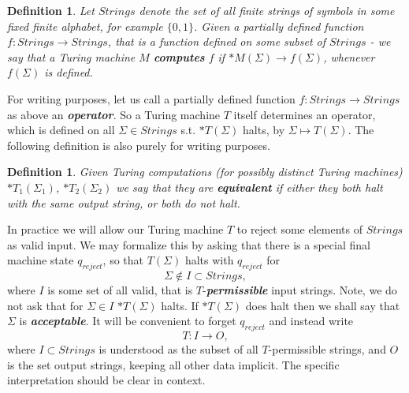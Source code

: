 \documentclass[9pt,twocolumn,twoside,lineno]{pnas-new}
\numberwithin{equation}{section}
\newtheorem{definition}[equation]{Definition}
\theoremstyle{definition}
\theoremstyle{remark}
\begin{document}
\begin{definition} Let $Strings$ denote the set of all finite strings of symbols in some fixed finite alphabet, for example $\{0,1\}$.
Given a partially defined function $f: Strings \to Strings$, that is a function defined on some subset of $Strings$ - we say that a Turing machine $M$ \textbf{\emph{computes}} $f$ if  $*M (\Sigma) \to f (\Sigma)$,  whenever $f (\Sigma)$ is defined.
\end{definition}
For writing purposes, let us call a partially defined function $f: Strings \to Strings$ as above an \textbf{\emph{operator}}.
 So a Turing machine $T$ itself determines an operator, which is defined on all $\Sigma \in Strings$ s.t. $*T (\Sigma)$ halts, by $\Sigma \mapsto T (\Sigma)$.  
The following definition is also purely for writing purposes.
\begin{definition} \label{def:equivalent} Given Turing computations (for possibly distinct Turing machines) $*T _{1} (\Sigma _{1} ) $, $* T _{2} (\Sigma _{2} ) $ we say that they are \textbf{\emph{equivalent}} if either they both halt with the same output string, or both do not halt. 
\end{definition} 
In practice we will allow our Turing machine $T$ to reject some elements of $Strings$ as valid input. We may formalize this by asking that there is a special final machine state $q _{reject} $, so that $T (\Sigma)$ halts with $q _{reject} $ for $$\Sigma \notin {I} \subset Strings,$$ where ${I}$ is some set of all valid, that is $T$-\textbf{\emph{permissible}} input strings. Note, we do not ask that for $\Sigma \in I$ $*T (\Sigma)$ halts. If $*T (\Sigma)$ does halt then we shall say that $\Sigma$ is \textbf{\emph{acceptable}}.
It will be convenient to forget $q _{reject} $ and instead write $$T: {I} \to O,$$ where ${I} \subset Strings$ is understood as the subset of all $T$-permissible strings, and $O$ is the set output strings, keeping all other data implicit. The specific interpretation should be clear in context.
\end{document}
